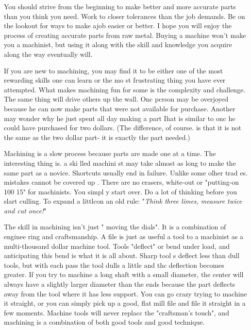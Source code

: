 
You should strive from the beginning to make better and more accurate parts than
you think you need. Work to closer tolerances than the job demands. Be on the
lookout for ways to make ajob easier or better. I hope you will enjoy the
process of creating accurate parts from raw metal. Buying a machine won't make
you a machinist, but using it along with the skill and knowledge you acquire
along the way eventually will.


If you are new to machining, you may find it to be
either one of the most rewarding skills one can learn
or the mo st frustrating thing you have ever
attempted. What makes machining fun for some is
the complexity and challenge. The same thing will
drive others up the wall. Onc pcrson may be
overjoyed because he can now make parts that were
not available for purchase. Another may wonder why
he just spent all day making a part Ihat is similar to
onc he could have purchased for two dollars. (The
difference, of course. is that it is not the same as the
two dollar part- it is exactly the part needed.)


Machining is a slow process because parts are made one at a time. The
interesting thing is. a ski lled machini st may take almost as long to make the
same part as a novice. Shortcuts usually end in failure.
Unlike some olher trad es. mistakes cannot be covered up . There are no erasers,
white-out or "putting-on 100 15" for machinists. You simpl y start over. Do a
lot of thinking before you slart culling.
To expand a littlcon an old rule: "\emph{Think three limes, measure twice and
cut once!}"


The skill in machining isn't just " moving the dials". It is a combination of
enginee ring and craftsmanship. A file is just as useful a tool to a machinist
as a multi-thousand dollar machine tool. Tools "deflect" or bend under load, and
anticipating this bend is what it is all about. Sharp tool s deflect less than
dull tools, but with each pass the tool dulls a little and thc deflection
becomes greater. If you try to machine a long shaft with a small diameter, the
center will always have a slightly larger diameter than the ends because the
part deflects away from the tool where it has less support. You can go crazy
trying to machine it straight, or you can simply pick up a good, flat mill file
and file it straight in a few moments. Machine tools will never replacc the
"craftsman's touch", and machining is a combination of both good tools and good
technique.


